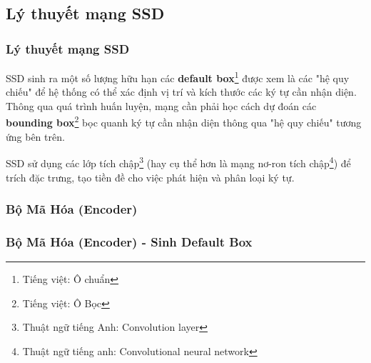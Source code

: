\documentclass{beamer}
\begin{document}
\subsection{Lý thuyết mạng SSD}

\frame{\tableofcontents[currentsection]}

\begin{frame}
	\frametitle{Lý thuyết mạng SSD}
	
	SSD\cite{liu2016ssd} sinh ra một số lượng hữu hạn các \textbf{default box}\footnote{Tiếng việt: Ô chuẩn} được xem là các "hệ quy chiếu" để hệ thống có thể xác định vị trí và kích thước các ký tự cần nhận diện. Thông qua quá trình huấn luyện, mạng cần phải học cách dự đoán các \textbf{bounding box}\footnote{Tiếng việt: Ô Bọc} bọc quanh ký tự cần nhận diện thông qua "hệ quy chiếu" tương ứng bên trên.
	
	SSD\cite{liu2016ssd} sử dụng các lớp tích chập\footnote{Thuật ngữ tiếng Anh: Convolution layer} (hay cụ thể hơn là mạng nơ-ron tích chập\footnote{Thuật ngữ tiếng anh: Convolutional neural network}) để trích đặc trưng, tạo tiền đề cho việc phát hiện và phân loại ký tự. \\
	
\end{frame}



\subsubsection{Bộ Mã Hóa (Encoder)}
\begin{frame}
	\frametitle{Bộ Mã Hóa (Encoder) - Sinh Default Box}
	
\end{frame}

\end{document}
